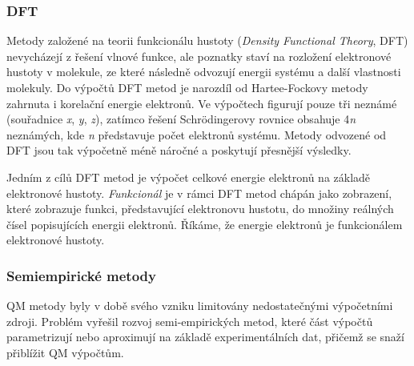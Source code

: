 

\subsubsection{DFT}
Metody založené na teorii funkcionálu hustoty (\textit{Density Functional Theory}, DFT) nevycházejí z řešení vlnové funkce, ale  poznatky staví na rozložení elektronové hustoty v molekule, ze které následně odvozují energii systému a další vlastnosti molekuly. Do výpočtů DFT metod je narozdíl od Hartee-Fockovy metody zahrnuta i korelační energie elektronů. Ve výpočtech figurují pouze tři neznámé (souřadnice \textit{x}, \textit{y}, \textit{z}), zatímco řešení Schrödingerovy rovnice obsahuje 4\textit{n} neznámých, kde \textit{n} představuje počet elektronů systému. Metody odvozené od DFT jsou tak výpočetně méně náročné a poskytují přesnější výsledky.

Jedním z cílů DFT metod je výpočet celkové energie elektronů na základě elektronové hustoty.\textit{ Funkcionál} je v rámci DFT metod chápán jako zobrazení, které zobrazuje funkci, představující elektronovu hustotu, do množiny reálných čísel popisujících energii elektronů. Říkáme, že energie elektronů je funkcionálem elektronové hustoty. %
\subsubsection{Semiempirické metody}
QM metody byly v době svého vzniku limitovány nedostatečnými výpočetními zdroji. Problém vyřešil rozvoj semi-empirických metod, které část výpočtů parametrizují nebo aproximují na základě experimentálních dat, přičemž se snaží přiblížit QM výpočtům. 

